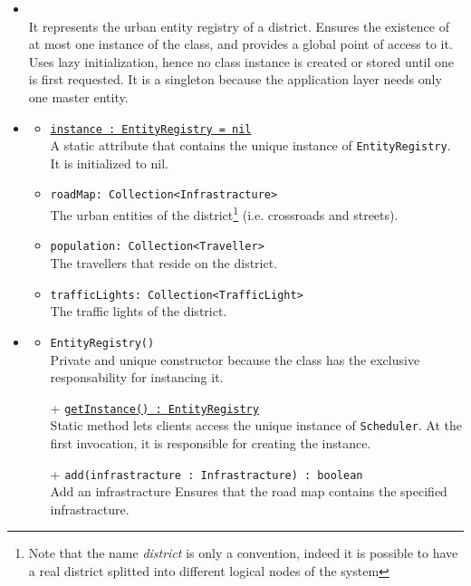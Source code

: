 \begin{itemize}
  \item \textbf{\descr} \\
  It represents the urban entity registry of a district.
  Ensures the existence of at most one instance of the class, 
  and provides a global point of access to it.
  Uses lazy initialization, hence no class instance is created 
  or stored until one is first requested.
  It is a singleton because the application layer needs 
  only one master entity.
  \item \textbf{\attrs}
  \begin{itemize}
    \item \texttt{\underline{instance : EntityRegistry = nil}} \\
    A static attribute that contains the unique instance of \texttt{EntityRegistry}.
    It is initialized to nil.
    \item \texttt{roadMap: Collection<Infrastracture>} \\
    The urban entities of the district\footnote{Note that the name 
    \textit{district} is only a convention, indeed it is possible to have a 
    real district splitted into different logical nodes of the system}
    (i.e. crossroads and streets). 
    \item \texttt{population: Collection<Traveller>} \\
    The travellers that reside on the district.
    \item \texttt{trafficLights: Collection<TrafficLight>} \\
    The traffic lights of the district.
  \end{itemize}
  \item \textbf{\ops}
  \begin{itemize}
    \item \texttt{EntityRegistry()} \\
    Private and unique constructor because the class has the exclusive 
    responsability for instancing it.
    \item[+] \texttt{\underline{getInstance() : EntityRegistry}} \\
    Static method lets clients access the unique instance 
    of \texttt{Scheduler}. At the first invocation, it is responsible 
    for creating the instance.
    \item[+] \texttt{add(infrastracture : Infrastracture) : boolean} \\
    Add an infrastracture
    Ensures that the road map contains the specified infrastracture.

\end{itemize}
\end{itemize}
